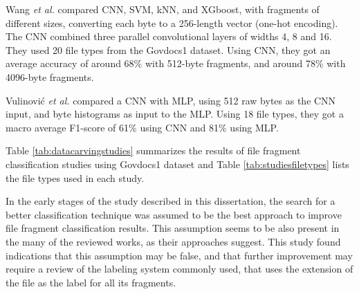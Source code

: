 Wang \textit{et al.} \cite{wang_file_2018}  
compared CNN, SVM, kNN, and XGboost, with fragments of different sizes, converting each byte to a 256-length vector (one-hot encoding). The CNN combined three parallel convolutional layers of widths 4, 8 and 16.
They used 20 file types from the Govdocs1 dataset.
Using CNN, they got an average accuracy of around 68\% with 512-byte fragments, and around 78\% with 4096-byte fragments.

Vulinović \textit{et al.} \cite{vulinovic_neural_2019}
compared a CNN with MLP, using 512 raw bytes as the CNN input, and byte histograms as input to the MLP.
Using 18 file types, they got a macro average F1-score of 61\% using CNN and 81\% using MLP.

Table \ref{tab:datacarvingstudies} summarizes 
the results of file fragment classification studies using Govdocs1 dataset and Table \ref{tab:studiesfiletypes}
lists the file types used in each study.





In the early stages of the study described in this dissertation, the search for a better classification technique was assumed to be the best approach to improve file fragment classification results. This assumption seems to be also present in the many of the reviewed works, as their approaches suggest. This study found indications that this assumption may be false, and that further improvement may require a review of the labeling system commonly used, that uses the extension of the file as the label for all its fragments.